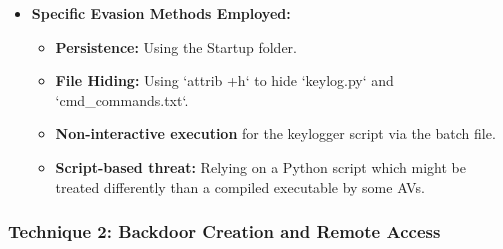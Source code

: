 \documentclass[11pt]{article}
\begin{document}
\begin{itemize}
		\item \textbf{Specific Evasion Methods Employed:}
		\begin{itemize}
			\item \textbf{Persistence:} Using the Startup folder.
			\item \textbf{File Hiding:} Using `attrib +h` to hide `keylog.py` and `cmd_commands.txt`.
			\item \textbf{Non-interactive execution} for the keylogger script via the batch file.
			\item \textbf{Script-based threat:} Relying on a Python script which might be treated differently than a compiled executable by some AVs.
		\end{itemize}
	\end{itemize}
	
	\subsubsection{Technique 2: Backdoor Creation and Remote Access}
\end{document}

